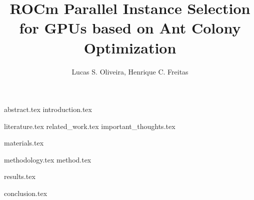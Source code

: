 \documentclass[12pt]{article}
\title{ROCm Parallel Instance Selection for GPUs based on Ant Colony Optimization}
\author{{Lucas S. Oliveira\inst{1}, Henrique C. Freitas\inst{1}}}
\begin{document}
\maketitle

{abstract.tex}
{introduction.tex}

{literature.tex}
{related_work.tex}
{important_thoughts.tex}

{materials.tex}

{methodology.tex}
{method.tex}

{results.tex}

{conclusion.tex}



\end{document}
